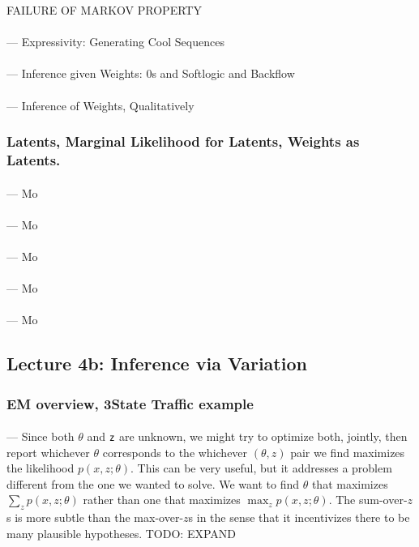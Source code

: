 \documentclass[12pt]{article}
\begin{document}
        FAILURE OF MARKOV PROPERTY

        \paragraph{\sf} --- Expressivity: Generating Cool Sequences
        \paragraph{\sf} --- Inference given Weights: 0s and Softlogic and Backflow
        \paragraph{\sf} --- Inference of Weights, Qualitatively

      \subsubsection*{Latents, Marginal Likelihood for Latents, Weights as Latents.}
        \paragraph{\sf} --- Mo
        \paragraph{\sf} --- Mo
        \paragraph{\sf} --- Mo
        \paragraph{\sf} --- Mo
        \paragraph{\sf} --- Mo
    \newpage

    \subsection*{Lecture 4b: Inference via Variation} %
      \subsubsection*{EM overview, 3State Traffic example}
        \paragraph{\sf} ---
          Since both $\theta$ and $\mathsf{z}$ are unknown, we might try to optimize
          both, jointly, then report whichever $\theta$ corresponds to the
          whichever $(\theta, z)$ pair we find maximizes the likelihood
          $p(x,z;\theta)$.  This can be very useful, but it addresses a problem
          different from the one we wanted to solve.  We want to find $\theta$
          that maximizes $\sum_z p(x,z;\theta)$ rather than one that maximizes
          $\max_z p(x,z;\theta)$.  The sum-over-$z$s is more subtle than the
          max-over-$z$s in the sense that it incentivizes there to be
          many plausible hypotheses.  TODO: EXPAND
\end{document}
